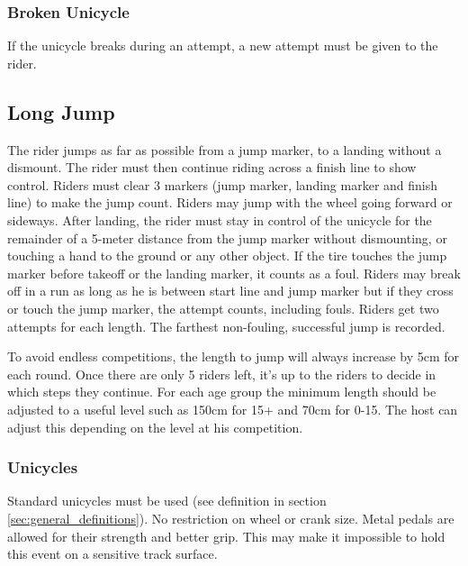 \subsubsection{Broken Unicycle}
If the unicycle breaks during an attempt, a new attempt must be given to the rider.

\subsection{Long Jump}
The rider jumps as far as possible from a jump marker, to a landing without a dismount.
The rider must then continue riding across a finish line to show control.
Riders must clear 3 markers (jump marker, landing marker and finish line) to make the jump count.
Riders may jump with the wheel going forward or sideways.
After landing, the rider must stay in control of the unicycle for the remainder of a 5-meter distance from the jump marker without dismounting, or touching a hand to the ground or any other object.
If the tire touches the jump marker before takeoff or the landing marker, it counts as a foul.
Riders may break off in a run as long as he is between start line and jump marker but if they cross or touch the jump marker, the attempt counts, including fouls.
Riders get two attempts for each length.
The farthest non-fouling, successful jump is recorded.

To avoid endless competitions, the length to jump will always increase by 5cm for each round.
Once there are only 5 riders left, it's up to the riders to decide in which steps they continue.
For each age group the minimum length should be adjusted to a useful level such as 150cm for 15+ and 70cm for 0-15.
The host can adjust this depending on the level at his competition.

\subsubsection{Unicycles}
Standard unicycles must be used (see definition in section \ref{sec:general_definitions}).
No restriction on wheel or crank size.
Metal pedals are allowed for their strength and better grip.
This may make it impossible to hold this event on a sensitive track surface.

